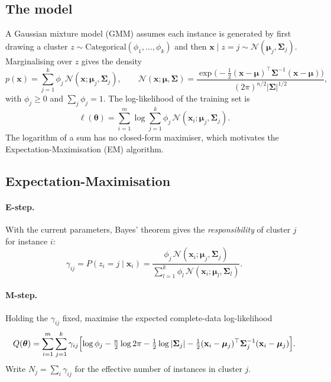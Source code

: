\documentclass[11pt,a4paper]{article}
\newcommand{\x}{\mathbf{x}}
\newcommand{\vmu}{\boldsymbol{\mu}}
\newcommand{\vSigma}{\boldsymbol{\Sigma}}
\newcommand{\vtheta}{\boldsymbol{\theta}}
\newcommand{\N}{\mathcal{N}}
\begin{document}
\subsection{The model}
A Gaussian mixture model (GMM) assumes each instance is generated by first drawing a cluster
$z\sim\text{Categorical}(\phi_1,\dots,\phi_k)$ and then $\x\mid z=j\sim\N(\vmu_j,\vSigma_j)$. Marginalising over
$z$ gives the density
\begin{equation}\label{eq:gmm}
  p(\x)=\sum_{j=1}^{k}\phi_j\,\N(\x;\vmu_j,\vSigma_j),\qquad
  \N(\x;\vmu,\vSigma)=\frac{\exp\!\bigl(-\tfrac12(\x-\vmu)^\top\vSigma^{-1}(\x-\vmu)\bigr)}{(2\pi)^{n/2}|\vSigma|^{1/2}},
\end{equation}
with $\phi_j\ge0$ and $\sum_j\phi_j=1$. The log-likelihood of the training set is
\begin{equation}\label{eq:loglik}
  \ell(\vtheta)=\sum_{i=1}^{m}\log\sum_{j=1}^{k}\phi_j\,\N(\x_i;\vmu_j,\vSigma_j).
\end{equation}
The logarithm of a sum has no closed-form maximiser, which motivates the Expectation-Maximisation (EM)
algorithm.

\subsection{Expectation-Maximisation}
\paragraph{E-step.} With the current parameters, Bayes' theorem gives the \emph{responsibility} of cluster $j$ for
instance $i$:
\begin{equation}\label{eq:resp}
  \gamma_{ij}=P(z_i=j\mid\x_i)=\frac{\phi_j\,\N(\x_i;\vmu_j,\vSigma_j)}{\sum_{l=1}^{k}\phi_l\,\N(\x_i;\vmu_l,\vSigma_l)} .
\end{equation}
\paragraph{M-step.} Holding the $\gamma_{ij}$ fixed, maximise the expected complete-data log-likelihood
\begin{equation}\label{eq:Q}
  Q(\vtheta)=\sum_{i=1}^{m}\sum_{j=1}^{k}\gamma_{ij}\Bigl[\log\phi_j-\tfrac{n}{2}\log 2\pi-\tfrac12\log|\vSigma_j|
  -\tfrac12(\x_i-\vmu_j)^\top\vSigma_j^{-1}(\x_i-\vmu_j)\Bigr].
\end{equation}
Write $N_j=\sum_{i}\gamma_{ij}$ for the effective number of instances in cluster $j$.
\end{document}
